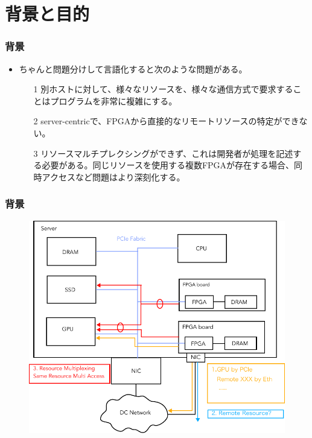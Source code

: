 \documentclass[dvipdfmx,9pt,notheorems]{beamer}
\theoremstyle{definition}
\begin{document}
\section{背景と目的}
\begin{frame}\frametitle{背景}
\begin{itemize}
	\item ちゃんと問題分けして言語化すると次のような問題がある。
	\begin{itemize}
		\item[1] 別ホストに対して、様々なリソースを、様々な通信方式で要求することはプログラムを非常に複雑にする。
		\item[2] server-centricで、FPGAから直接的なリモートリソースの特定ができない。
		\item[3] リソースマルチプレクシングができず、これは開発者が処理を記述する必要がある。同じリソースを使用する複数FPGAが存在する場合、同時アクセスなど問題はより深刻化する。
	\end{itemize}
\end{itemize}
\end{frame}


\begin{frame}\frametitle{背景}
  \begin{figure}[htb]
		\includegraphics[scale=0.5]{fig/ez_FPGA_Base.pdf}
  \end{figure}
\pnote{
}
\end{frame}
\end{document}
